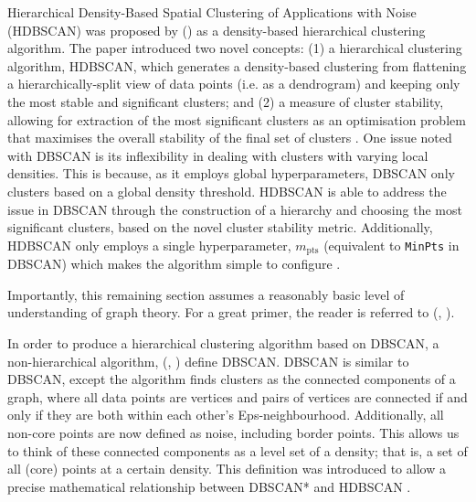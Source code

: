 \documentclass[10pt,oneside]{report}
\renewcommand{\citet}[1]{\citeauthor{#1}, \citeyear{#1}}
\begin{document}
Hierarchical Density-Based Spatial Clustering of Applications with Noise (HDBSCAN) was proposed by (\cite{campello2013density}) as a density-based hierarchical clustering algorithm. The paper introduced two novel concepts: (1) a hierarchical clustering algorithm, HDBSCAN, which generates a density-based clustering from flattening a hierarchically-split view of data points (i.e. as a dendrogram) and keeping only the most stable and significant clusters; and (2) a measure of cluster stability, allowing for extraction of the most significant clusters as an optimisation problem that maximises the overall stability of the final set of clusters \cite{campello2013density}. One issue noted with DBSCAN is its inflexibility in dealing with clusters with varying local densities. This is because, as it employs global hyperparameters, DBSCAN only clusters based on a global density threshold. HDBSCAN is able to address the issue in DBSCAN through the construction of a hierarchy and choosing the most significant clusters, based on the novel cluster stability metric. Additionally, HDBSCAN only employs a single hyperparameter, $m_{\text{pts}}$ (equivalent to \texttt{MinPts} in DBSCAN) which makes the algorithm simple to configure \cite{campello2013density}.

Importantly, this remaining section assumes a reasonably basic level of understanding of graph theory. For a great primer, the reader is referred to (\citet{harris2008combinatorics}).

In order to produce a hierarchical clustering algorithm based on DBSCAN, a non-hierarchical algorithm, (\citet{campello2013density}) define DBSCAN\*. DBSCAN\* is similar to DBSCAN, except the algorithm finds clusters as the connected components of a graph, where all data points are vertices and pairs of vertices are connected if and only if they are both within each other's Eps-neighbourhood. Additionally, all non-core points are now defined as noise, including border points. This allows us to think of these connected components as a level set of a density; that is, a set of all (core) points at a certain density. This definition was introduced to allow a precise mathematical relationship between DBSCAN* and HDBSCAN \cite{campello2013density}. 
\end{document}
